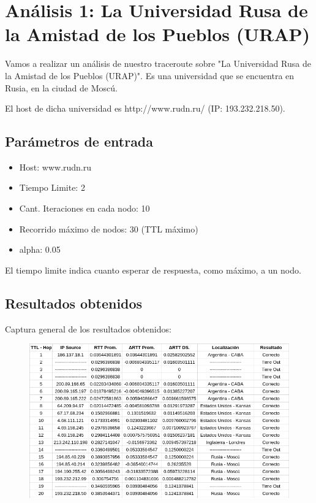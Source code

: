 \section{An\'alisis 1: La Universidad Rusa de la Amistad de los Pueblos (URAP)}
Vamos a realizar un an\'alisis de nuestro traceroute sobre "La Universidad Rusa de la Amistad de los Pueblos (URAP)". Es una universidad que se encuentra en Rusia, en la ciudad de Mosc\'u.\newline

El host de dicha universidad es http://www.rudn.ru/ (IP: 193.232.218.50).\\	

\subsection{Par\'ametros de entrada}
\begin{itemize}
\item Host: www.rudn.ru
\item Tiempo Limite: 2
\item Cant. Iteraciones en cada nodo: 10
\item Recorrido m\'aximo de nodos: 30 (TTL m\'aximo)
\item alpha: 0.05
\end{itemize}
El tiempo limite indica cuanto esperar de respuesta, como m\'aximo, a un nodo.\newline

\subsection{Resultados obtenidos}

Captura general de los resultados obtenidos:

\begin{figure}[h]
    \includegraphics[width=1\textwidth]{img_analisis1/tabla.png}
    
\end{figure}
\vspace{0.25cm}



